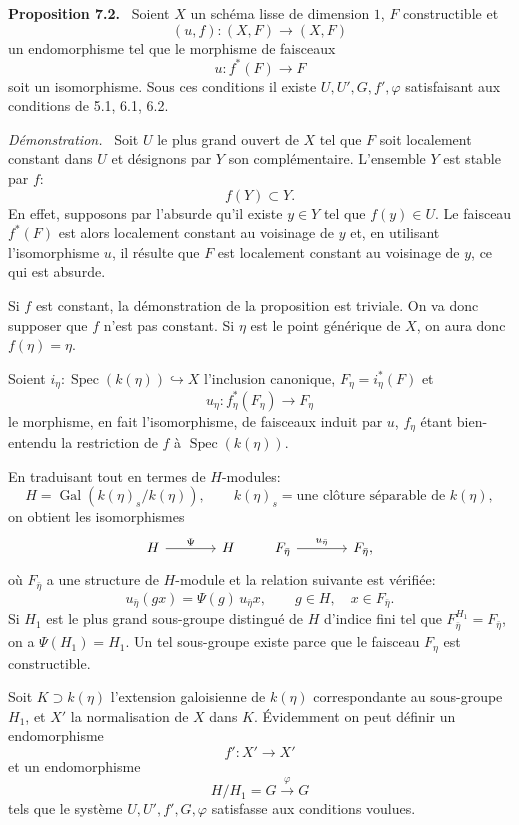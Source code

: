 \documentclass[11pt]{article}
\newenvironment{statement}[1]{\par\medskip\noindent\textbf{#1.}\ }{\par\medskip}
\newenvironment{prooftext}[1][Proof]{\par\noindent\emph{#1.}\ }{\par\medskip}
\DeclareMathOperator{\Spec}{Spec}
\providecommand{\Gal}{\operatorname{Gal}}
\providecommand{\Spec}{\operatorname{Spec}}
\providecommand{\Spec}{\operatorname{Spec}}
\providecommand{\Spec}{\operatorname{Spec}}
\providecommand{\Spec}{\operatorname{Spec}}
\providecommand{\Gal}{\operatorname{Gal}}
\begin{document}
\begin{statement}{Proposition 7.2}
Soient $X$ un schéma lisse de dimension $1$, $F$ constructible et
\[
(u,f):(X,F)\longrightarrow (X,F)
\]
un endomorphisme tel que le morphisme de faisceaux
\[
u:f^*(F)\longrightarrow F
\]
soit un isomorphisme. Sous ces conditions il existe $U,U',G,f',\varphi$ satisfaisant aux conditions de 5.1, 6.1, 6.2.
\end{statement}

\begin{prooftext}[Démonstration]
Soit $U$ le plus grand ouvert de $X$ tel que $F$ soit localement constant dans $U$ et désignons par $Y$ son complémentaire. L'ensemble $Y$ est stable par $f$:
\[
f(Y)\subset Y.
\]
En effet, supposons par l'absurde qu'il existe $y\in Y$ tel que $f(y)\in U$. Le faisceau $f^*(F)$ est alors localement constant au voisinage de $y$ et, en utilisant l'isomorphisme $u$, il résulte que $F$ est localement constant au voisinage de $y$, ce qui est absurde.

Si $f$ est constant, la démonstration de la proposition est triviale. On va donc supposer que $f$ n'est pas constant. Si $\eta$ est le point générique de $X$, on aura donc $f(\eta)=\eta$.

Soient $i_\eta:\Spec(k(\eta))\hookrightarrow X$ l'inclusion canonique, $F_\eta=i_\eta^*(F)$ et
\[
u_\eta:f_\eta^*(F_\eta)\longrightarrow F_\eta
\]
le morphisme, en fait l'isomorphisme, de faisceaux induit par $u$, $f_\eta$ étant bien-entendu la restriction de $f$ à $\Spec(k(\eta))$.

En traduisant tout en termes de $H$-modules:
\[
H=\Gal(k(\eta)_s/k(\eta)),\qquad k(\eta)_s=\text{une clôture séparable de }k(\eta),
\]
on obtient les isomorphismes
\[
\begin{tikzcd}[column sep=large]
H \arrow[r,"\Psi"] & H
\end{tikzcd}
\qquad
\begin{tikzcd}[column sep=large]
F_{\bar\eta} \arrow[r,"u_{\bar\eta}"] & F_{\bar\eta},
\end{tikzcd}
\]
où $F_{\bar\eta}$ a une structure de $H$-module et la relation suivante est vérifiée:
\[
u_{\bar\eta}(gx)=\Psi(g)\,u_{\bar\eta} x,
\qquad g\in H,
\quad x\in F_{\bar\eta}.
\]
Si $H_1$ est le plus grand sous-groupe distingué de $H$ d'indice fini tel que $F_{\bar\eta}^{H_1}=F_{\bar\eta}$, on a $\Psi(H_1)=H_1$. Un tel sous-groupe existe parce que le faisceau $F_\eta$ est constructible.

Soit $K\supset k(\eta)$ l'extension galoisienne de $k(\eta)$ correspondante au sous-groupe $H_1$, et $X'$ la normalisation de $X$ dans $K$. Évidemment on peut définir un endomorphisme
\[
f':X'\longrightarrow X'
\]
et un endomorphisme
\[
H/H_1=G\xrightarrow{\varphi}G
\]
tels que le système $U,U',f',G,\varphi$ satisfasse aux conditions voulues.
\end{prooftext}
\end{document}
